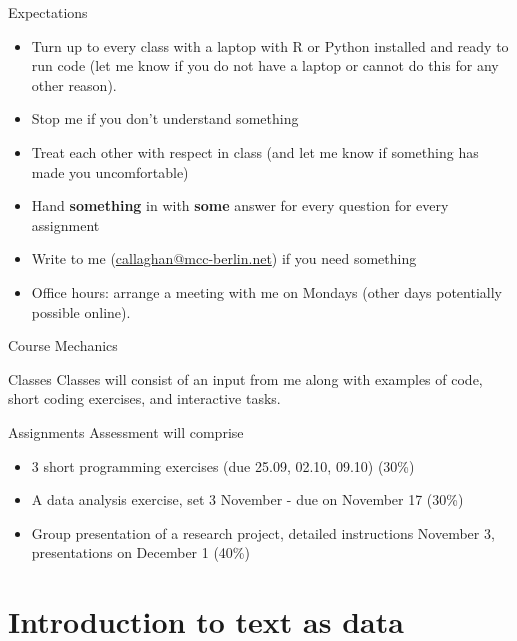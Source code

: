 \documentclass[
  10pt,
  ignorenonframetext,
  aspectratio=169]{beamer}
\providecommand{\tightlist}{%
  \setlength{\itemsep}{0pt}\setlength{\parskip}{0pt}}
\begin{document}
\begin{frame}{Expectations}
\protect\hypertarget{expectations}{}
\begin{itemize}
\item
  Turn up to every class with a laptop with R or Python installed and
  ready to run code (let me know if you do not have a laptop or cannot
  do this for any other reason).
\item
  Stop me if you don't understand something
\item
  Treat each other with respect in class (and let me know if something
  has made you uncomfortable)
\item
  Hand \textbf{something} in with \textbf{some} answer for every
  question for every assignment
\item
  Write to me (\url{callaghan@mcc-berlin.net}) if you need something
\item
  Office hours: arrange a meeting with me on Mondays (other days
  potentially possible online).
\end{itemize}
\end{frame}

\begin{frame}{Course Mechanics}
\protect\hypertarget{course-mechanics}{}
\begin{block}{Classes}
\protect\hypertarget{classes}{}
Classes will consist of an input from me along with examples of code,
short coding exercises, and interactive tasks.
\end{block}

\begin{block}{Assignments}
\protect\hypertarget{assignments}{}
Assessment will comprise

\begin{itemize}
\tightlist
\item
  3 short programming exercises (due 25.09, 02.10, 09.10) (30\%)
\item
  A data analysis exercise, set 3 November - due on November 17 (30\%)
\item
  Group presentation of a research project, detailed instructions
  November 3, presentations on December 1 (40\%)
\end{itemize}
\end{block}
\end{frame}

\hypertarget{introduction-to-text-as-data}{%
\section{Introduction to text as
data}\label{introduction-to-text-as-data}}
\end{document}
